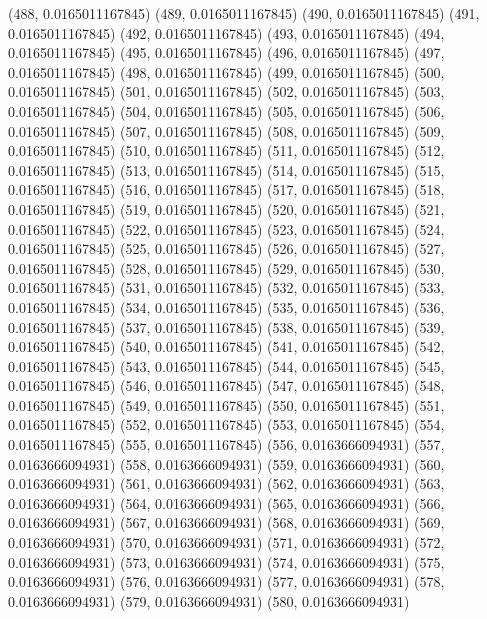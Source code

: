 {					(488, 0.0165011167845)
					(489, 0.0165011167845)
					(490, 0.0165011167845)
					(491, 0.0165011167845)
					(492, 0.0165011167845)
					(493, 0.0165011167845)
					(494, 0.0165011167845)
					(495, 0.0165011167845)
					(496, 0.0165011167845)
					(497, 0.0165011167845)
					(498, 0.0165011167845)
					(499, 0.0165011167845)
					(500, 0.0165011167845)
					(501, 0.0165011167845)
					(502, 0.0165011167845)
					(503, 0.0165011167845)
					(504, 0.0165011167845)
					(505, 0.0165011167845)
					(506, 0.0165011167845)
					(507, 0.0165011167845)
					(508, 0.0165011167845)
					(509, 0.0165011167845)
					(510, 0.0165011167845)
					(511, 0.0165011167845)
					(512, 0.0165011167845)
					(513, 0.0165011167845)
					(514, 0.0165011167845)
					(515, 0.0165011167845)
					(516, 0.0165011167845)
					(517, 0.0165011167845)
					(518, 0.0165011167845)
					(519, 0.0165011167845)
					(520, 0.0165011167845)
					(521, 0.0165011167845)
					(522, 0.0165011167845)
					(523, 0.0165011167845)
					(524, 0.0165011167845)
					(525, 0.0165011167845)
					(526, 0.0165011167845)
					(527, 0.0165011167845)
					(528, 0.0165011167845)
					(529, 0.0165011167845)
					(530, 0.0165011167845)
					(531, 0.0165011167845)
					(532, 0.0165011167845)
					(533, 0.0165011167845)
					(534, 0.0165011167845)
					(535, 0.0165011167845)
					(536, 0.0165011167845)
					(537, 0.0165011167845)
					(538, 0.0165011167845)
					(539, 0.0165011167845)
					(540, 0.0165011167845)
					(541, 0.0165011167845)
					(542, 0.0165011167845)
					(543, 0.0165011167845)
					(544, 0.0165011167845)
					(545, 0.0165011167845)
					(546, 0.0165011167845)
					(547, 0.0165011167845)
					(548, 0.0165011167845)
					(549, 0.0165011167845)
					(550, 0.0165011167845)
					(551, 0.0165011167845)
					(552, 0.0165011167845)
					(553, 0.0165011167845)
					(554, 0.0165011167845)
					(555, 0.0165011167845)
					(556, 0.0163666094931)
					(557, 0.0163666094931)
					(558, 0.0163666094931)
					(559, 0.0163666094931)
					(560, 0.0163666094931)
					(561, 0.0163666094931)
					(562, 0.0163666094931)
					(563, 0.0163666094931)
					(564, 0.0163666094931)
					(565, 0.0163666094931)
					(566, 0.0163666094931)
					(567, 0.0163666094931)
					(568, 0.0163666094931)
					(569, 0.0163666094931)
					(570, 0.0163666094931)
					(571, 0.0163666094931)
					(572, 0.0163666094931)
					(573, 0.0163666094931)
					(574, 0.0163666094931)
					(575, 0.0163666094931)
					(576, 0.0163666094931)
					(577, 0.0163666094931)
					(578, 0.0163666094931)
					(579, 0.0163666094931)
					(580, 0.0163666094931)
}
